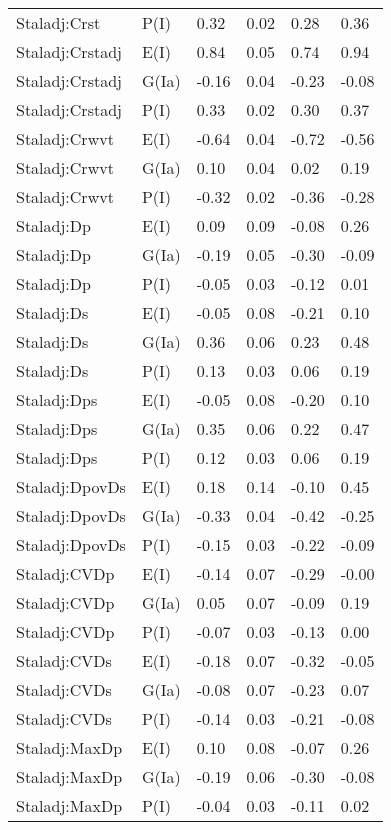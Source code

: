 \begin{center}
\begin{longtable}{|p{1.1in}|p{0.7in}|p{0.7in}|p{0.6in}|p{0.6in}|p{0.6in}|}
  Staladj:Crst & P(I) & 0.32 & 0.02 & 0.28 & 0.36 \\ 
  Staladj:Crstadj & E(I) & 0.84 & 0.05 & 0.74 & 0.94 \\ 
  Staladj:Crstadj & G(Ia) & -0.16 & 0.04 & -0.23 & -0.08 \\ 
  Staladj:Crstadj & P(I) & 0.33 & 0.02 & 0.30 & 0.37 \\ 
  Staladj:Crwvt & E(I) & -0.64 & 0.04 & -0.72 & -0.56 \\ 
  Staladj:Crwvt & G(Ia) & 0.10 & 0.04 & 0.02 & 0.19 \\ 
  Staladj:Crwvt & P(I) & -0.32 & 0.02 & -0.36 & -0.28 \\ 
  Staladj:Dp & E(I) & 0.09 & 0.09 & -0.08 & 0.26 \\ 
  Staladj:Dp & G(Ia) & -0.19 & 0.05 & -0.30 & -0.09 \\ 
  Staladj:Dp & P(I) & -0.05 & 0.03 & -0.12 & 0.01 \\ 
  Staladj:Ds & E(I) & -0.05 & 0.08 & -0.21 & 0.10 \\ 
  Staladj:Ds & G(Ia) & 0.36 & 0.06 & 0.23 & 0.48 \\ 
  Staladj:Ds & P(I) & 0.13 & 0.03 & 0.06 & 0.19 \\ 
  Staladj:Dps & E(I) & -0.05 & 0.08 & -0.20 & 0.10 \\ 
  Staladj:Dps & G(Ia) & 0.35 & 0.06 & 0.22 & 0.47 \\ 
  Staladj:Dps & P(I) & 0.12 & 0.03 & 0.06 & 0.19 \\ 
  Staladj:DpovDs & E(I) & 0.18 & 0.14 & -0.10 & 0.45 \\ 
  Staladj:DpovDs & G(Ia) & -0.33 & 0.04 & -0.42 & -0.25 \\ 
  Staladj:DpovDs & P(I) & -0.15 & 0.03 & -0.22 & -0.09 \\ 
  Staladj:CVDp & E(I) & -0.14 & 0.07 & -0.29 & -0.00 \\ 
  Staladj:CVDp & G(Ia) & 0.05 & 0.07 & -0.09 & 0.19 \\ 
  Staladj:CVDp & P(I) & -0.07 & 0.03 & -0.13 & 0.00 \\ 
  Staladj:CVDs & E(I) & -0.18 & 0.07 & -0.32 & -0.05 \\ 
  Staladj:CVDs & G(Ia) & -0.08 & 0.07 & -0.23 & 0.07 \\ 
  Staladj:CVDs & P(I) & -0.14 & 0.03 & -0.21 & -0.08 \\ 
  Staladj:MaxDp & E(I) & 0.10 & 0.08 & -0.07 & 0.26 \\ 
  Staladj:MaxDp & G(Ia) & -0.19 & 0.06 & -0.30 & -0.08 \\ 
  Staladj:MaxDp & P(I) & -0.04 & 0.03 & -0.11 & 0.02 \\ 

\end{longtable}
\end{center}
